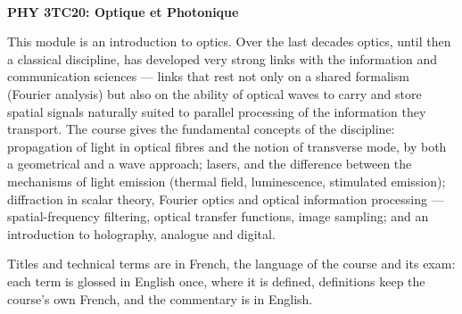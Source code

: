 \documentclass[10pt]{article}
\begin{document}
\thispagestyle{empty}
\bigskip \
\vspace{0.1cm}

\begin{center}
{\fontsize{30}{30} \selectfont \bf \sffamily PHY 3TC20: Optique et Photonique }\\
\vspace{24pt}
\end{center}

{\parindent0pt \baselineskip=15.5pt
  This module is an introduction to optics. Over the last decades optics, until
  then a classical discipline, has developed very strong links with the
  information and communication sciences --- links that rest not only on a
  shared formalism (Fourier analysis) but also on the ability of optical waves
  to carry and store spatial signals naturally suited to parallel processing of
  the information they transport. The course gives the fundamental concepts of
  the discipline: propagation of light in optical fibres and the notion of
  transverse mode, by both a geometrical and a wave approach; lasers, and the
  difference between the mechanisms of light emission (thermal field,
  luminescence, stimulated emission); diffraction in scalar theory, Fourier
  optics and optical information processing --- spatial-frequency filtering,
  optical transfer functions, image sampling; and an introduction to
  holography, analogue and digital.

  \medskip
  Titles and technical terms are in French, the language of the course and its exam:
  each term is glossed in English once, where it is defined, definitions keep the
  course's own French, and the commentary is in English.
}

\microtoc%
\newpage








\end{document}

